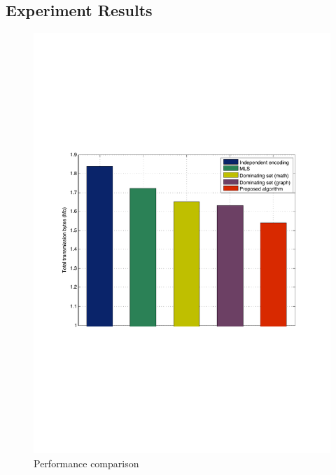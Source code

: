\subsection{Experiment Results}
\label{sec:ExperimentResults}

\begin{figure}
\begin{center}
\includegraphics[width=0.9\columnwidth]{./fig/transByte5.pdf}
\caption{\label{fig::transByte}Performance comparison}
\end{center}
\end{figure}

